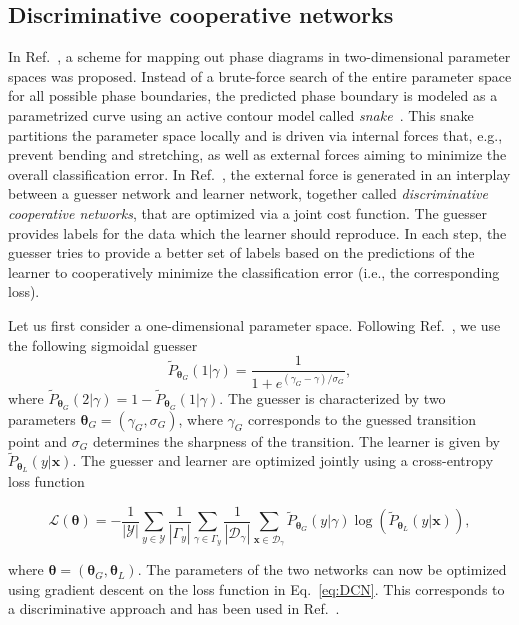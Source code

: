 \documentclass[twocolumn,aps,pra,superscriptaddress,tightlines,nofootinbib]{revtex4-2}
\begin{document}
	\subsection{Discriminative cooperative networks}
	\indent In Ref.~\cite{liu:2018}, a scheme for mapping out phase diagrams in two-dimensional parameter spaces was proposed. Instead of a brute-force search of the entire parameter space for all possible phase boundaries, the predicted phase boundary is modeled as a parametrized curve using an active contour model called \emph{snake}~\cite{kass:1988}. This snake partitions the parameter space locally and is driven via internal forces that, e.g., prevent bending and stretching, as well as external forces aiming to minimize the overall classification error. In Ref.~\cite{liu:2018}, the external force is generated in an interplay between a guesser network and learner network, together called \emph{discriminative cooperative networks}, that are optimized via a joint cost function. The guesser provides labels for the data which the learner should reproduce. In each step, the guesser tries to provide a better set of labels based on the predictions of the learner to cooperatively minimize the classification error (i.e., the corresponding loss).
	
	\indent Let us first consider a one-dimensional parameter space. Following Ref.~\cite{liu:2018}, we use the following sigmoidal guesser
	\begin{equation}
		\tilde{P}_{\bm{\theta}_{G}}(1|\gamma) = \frac{1}{1+e^{(\gamma_{G} - \gamma)/\sigma_{G}}},
	\end{equation}
	where $\tilde{P}_{\bm{\theta}_{G}}(2|\gamma) = 1 - \tilde{P}_{\bm{\theta}_{G}}(1|\gamma)$. The guesser is characterized by two parameters $\bm{\theta}_{G}=(\gamma_{G},\sigma_{G})$, where $\gamma_{G}$ corresponds to the guessed transition point and $\sigma_{G}$ determines the sharpness of the transition. The learner is given by $\tilde{P}_{\bm{\theta}_{L}}(y|\bm{x})$. The guesser and learner are optimized jointly using a cross-entropy loss function
	\begin{widetext}
		\begin{equation}\label{eq:DCN}
			\mathcal{L}(\bm{\theta}) = -  \frac{1}{|\mathcal{Y}|}\sum_{y \in \mathcal{Y}} \frac{1}{|\Gamma_{y}|}\sum_{\gamma \in \Gamma_{y}}\frac{1}{|\mathcal{D}_{\gamma}|}\sum_{\bm{x} \in \mathcal{D}_{\gamma}} \tilde{P}_{\bm{\theta}_{G}}(y|\gamma) \log\left(\tilde{P}_{\bm{\theta}_{L}}(y|\bm{x})\right),
		\end{equation}
	\end{widetext}
	where $\bm{\theta} = \left( {\bm{\theta}_{G}}, {\bm{\theta}_{L}}\right)$. The parameters of the two networks can now be optimized using gradient descent on the loss function in Eq.~\eqref{eq:DCN}. This corresponds to a discriminative approach and has been used in Ref.~\cite{liu:2018}.
	
\end{document}
